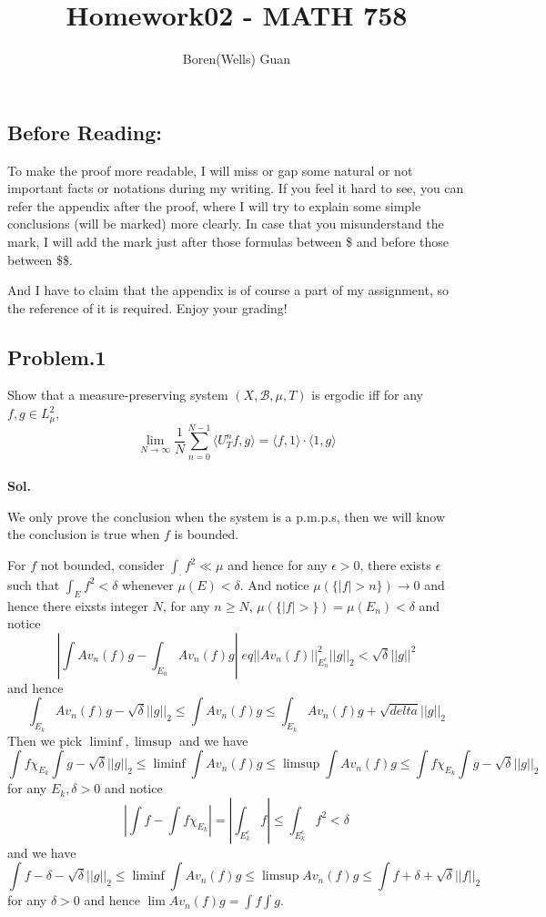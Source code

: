 \documentclass[lang=en,11pt,a4paper,citestyle =authoryear]{elegantpaper}
\title{Homework02 - MATH 758}
\author{Boren(Wells) Guan}
\begin{document}
\maketitle

\subsection*{Before Reading:}\par
To make the proof more readable, I will miss or gap some natural or not important facts or notations during my writing. If you feel it hard to see, you can refer the appendix after the proof, where I will try to explain some simple conclusions (will be marked) more clearly. In case that you misunderstand the mark, I will add the mark just after those formulas between \$ and before those between \$\$.\par
And I have to claim that the appendix is of course a part of my assignment, so the reference of it is required. Enjoy your grading!

\subsection*{Problem.1} 
Show that a measure-preserving system $(X,\mathcal{B},\mu,T)$ is ergodic iff for any $f,g\in L_{\mu}^2$,
\[\lim_{N\to\infty} \dfrac{1}{N}\sum\limits_{n=0}^{N-1}\langle U_T^n f,g\rangle = \langle f,1\rangle \cdot \langle 1,g\rangle\]
\vspace{0.5em}\\
\textbf{Sol.} \par
We only prove the conclusion when the system is a p.m.p.s, then we will know the conclusion is true when $f$ is bounded.\par
For $f$ not bounded, consider $\int_{\cdot} f^2 \ll \mu$ and hence for any $\epsilon > 0$, there exists $\epsilon$ such that $\int_E f^2 < \delta$ whenever $\mu(E) < \delta$. And notice $\mu(\{|f|>n\}) \to 0$ and hence there eixsts integer $N$, for any $n \geq N$, $\mu(\{|f|>\}) = \mu (E_n) < \delta$ and notice
\[|\int Av_n(f) g - \int_{E_n} Av_n(f)g| \;eq ||Av_n(f)||_{E_n^c}^2||g||_2 < \sqrt{\delta}||g||^2\]
and hence
\[\int_{E_k}Av_n(f)g - \sqrt{\delta}||g||_2 \leq \int Av_n(f)g \leq \int_{E_k}Av_n(f)g+\sqrt{delta}||g||_2\]
Then we pick $\liminf, \limsup$ and we have
\[\int f\chi_{E_k}\int g -\sqrt{\delta}||g||_2 \leq \liminf \int Av_n(f)g \leq \limsup \int Av_n(f) g \leq\int f\chi_{E_k}\int g -\sqrt{\delta}||g||_2\]
for any $E_k, \delta > 0$ and notice
\[|\int f - \int f\chi_{E_k}| = |\int_{E_k^c} f | \leq \int_{E_k^c} f^2 < \delta\]
and we have
\[\int f - \delta - \sqrt{\delta}||g||_2 \leq \liminf \int Av_n(f)g \leq \limsup Av_n(f)g \leq \int f +\delta + \sqrt{\delta}||f||_2\]
for any $\delta > 0$ and hence $\lim Av_n(f)g = \int f\int g$.
\end{document}
